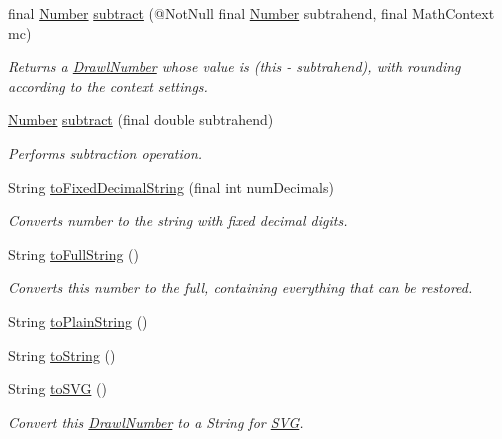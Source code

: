 \begin{DoxyCompactItemize}
final \hyperlink{interfacecom_1_1aarrelaakso_1_1drawl_1_1_number}{Number} \hyperlink{classcom_1_1aarrelaakso_1_1drawl_1_1_drawl_number_aaf0d1f797d24144d3ec2dba861217cb9}{subtract} (@Not\+Null final \hyperlink{interfacecom_1_1aarrelaakso_1_1drawl_1_1_number}{Number} subtrahend, final Math\+Context mc)
\begin{DoxyCompactList}\small\item\em Returns a \hyperlink{classcom_1_1aarrelaakso_1_1drawl_1_1_drawl_number}{Drawl\+Number} whose value is (this -\/ subtrahend), with rounding according to the context settings. \end{DoxyCompactList}\item 
\hyperlink{interfacecom_1_1aarrelaakso_1_1drawl_1_1_number}{Number} \hyperlink{classcom_1_1aarrelaakso_1_1drawl_1_1_drawl_number_ade985c4a55ea33886939801ceacd254c}{subtract} (final double subtrahend)
\begin{DoxyCompactList}\small\item\em Performs subtraction operation. \end{DoxyCompactList}\item 
String \hyperlink{classcom_1_1aarrelaakso_1_1drawl_1_1_drawl_number_a5fe84caaf56b210850be966218f70ca9}{to\+Fixed\+Decimal\+String} (final int num\+Decimals)
\begin{DoxyCompactList}\small\item\em Converts number to the string with fixed decimal digits. \end{DoxyCompactList}\item 
String \hyperlink{classcom_1_1aarrelaakso_1_1drawl_1_1_drawl_number_afa8d185aa5f961e7d54e62c96d788660}{to\+Full\+String} ()
\begin{DoxyCompactList}\small\item\em Converts this number to the full, containing everything that can be restored. \end{DoxyCompactList}\item 
String \hyperlink{classcom_1_1aarrelaakso_1_1drawl_1_1_drawl_number_a07c4c1c3a0e81ae9aef3325bef3e0152}{to\+Plain\+String} ()
\item 
String \hyperlink{classcom_1_1aarrelaakso_1_1drawl_1_1_drawl_number_a24775bf5217d477c4b39149596210184}{to\+String} ()
\item 
String \hyperlink{classcom_1_1aarrelaakso_1_1drawl_1_1_drawl_number_a63169b633e2d9807b56379238f5acaa0}{to\+S\+VG} ()
\begin{DoxyCompactList}\small\item\em Convert this \hyperlink{classcom_1_1aarrelaakso_1_1drawl_1_1_drawl_number}{Drawl\+Number} to a String for \hyperlink{classcom_1_1aarrelaakso_1_1drawl_1_1_s_v_g}{S\+VG}. \end{DoxyCompactList}\end{DoxyCompactItemize}
